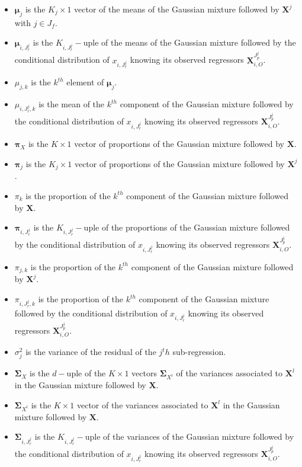 \documentclass[12pt,a4paper]{report}
\begin{document}
\begin{appendices}
\begin{itemize}
	\item $\boldsymbol{\mu}_j$ is the $K_j \times 1$ vector of the means of the Gaussian mixture followed by $\boldsymbol{X}^j$ with $j\in J_f$.
	\item $\boldsymbol{\mu}_{i,J_r^j}$ is the $K_{i,J_r^j}-$uple of the means of the Gaussian mixture followed by the conditional distribution of $x_{i,J_r^j}$ knowing its observed regressors $\boldsymbol{X}_{i,O}^{J_p^j}$.	
	\item $\mu_{j,k}$ is the $k^{th}$ element of $\boldsymbol{\mu}_j$.
	\item $\mu_{i,J_r^j,k}$ is the mean of the $k^{th}$ component of the Gaussian mixture followed by the conditional distribution of $x_{i,J_r^j}$ knowing its observed regressors $\boldsymbol{X}_{i,O}^{J_p^j}$.
	\item $\boldsymbol{\pi}_X$ is the $K \times 1 $ vector of proportions of the Gaussian mixture followed by $\boldsymbol{X}$.
	\item $\boldsymbol{\pi}_j$ is the $K_j \times 1 $ vector of proportions of the Gaussian mixture followed by $\boldsymbol{X}^j$.
	\item $\pi_k$ is the proportion of the $k^{th}$ component of the Gaussian mixture followed by $\boldsymbol{X}$.
	\item $\boldsymbol{\pi}_{i,J_r^j}$ is the $K_{i,J_r^j}-$uple of the proportions of the Gaussian mixture followed by the conditional distribution of $x_{i,J_r^j}$ knowing its observed regressors $\boldsymbol{X}_{i,O}^{J_p^j}$.
	\item $\pi_{j,k}$ is the proportion of the $k^{th}$ component of the Gaussian mixture followed by $\boldsymbol{X}^j$.
	\item $\pi_{i,J_r^j,k}$ is the proportion of the $k^{th}$ component of the Gaussian mixture followed by the conditional distribution of $x_{i,J_r^j}$ knowing its observed regressors $\boldsymbol{X}_{i,O}^{J_p^j}$.
	\item $\sigma_j^2$ is the variance of the residual of the $j^th$ sub-regression.	
	\item $\boldsymbol{\Sigma}_X$ is the $d-$uple of the $K \times 1 $ vectors $\boldsymbol{\Sigma}_{X^l}$ of the variances associated to $\boldsymbol{X}^l$ in the Gaussian mixture followed by $\boldsymbol{X}$.
	\item $\boldsymbol{\Sigma}_{X^l}$ is the $K \times 1 $ vector of the variances associated to $\boldsymbol{X}^l$ in the Gaussian mixture followed by $\boldsymbol{X}$.
	\item $\boldsymbol{\Sigma}_{i,J_r^j}$ is the $K_{i,J_r^j}-$uple of the variances of the Gaussian mixture followed by the conditional distribution of $x_{i,J_r^j}$ knowing its observed regressors $\boldsymbol{X}_{i,O}^{J_p^j}$.	

\end{itemize}
\end{appendices}
\end{document}
